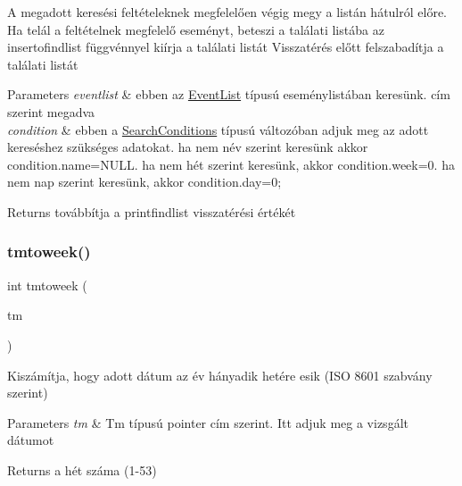 A megadott keresési feltételeknek megfelelően végig megy a listán hátulról előre. Ha telál a feltételnek megfelelő eseményt, beteszi a találati listába az insertofindlist függvénnyel kiírja a találati listát Visszatérés előtt felszabadítja a találati listát 
\begin{DoxyParams}{Parameters}
{\em eventlist} & ebben az \hyperlink{struct_event_list}{Event\+List} típusú eseménylistában keresünk. cím szerint megadva \\
\hline
{\em condition} & ebben a \hyperlink{struct_search_conditions}{Search\+Conditions} típusú változóban adjuk meg az adott kereséshez szükséges adatokat. ha nem név szerint keresünk akkor condition.\+name=N\+U\+LL. ha nem hét szerint keresünk, akkor condition.\+week=0. ha nem nap szerint keresünk, akkor condition.\+day=0; \\
\hline
\end{DoxyParams}
\begin{DoxyReturn}{Returns}
továbbítja a printfindlist visszatérési értékét 
\end{DoxyReturn}
\mbox{\label{group__search_ga4e80bfd47c2fef45e9f6f50632544931}} 
\subsubsection{\texorpdfstring{tmtoweek()}{tmtoweek()}}
{\footnotesize\ttfamily int tmtoweek (\begin{DoxyParamCaption}\item[{\hyperlink{group__list_gaffc453d30a4a6ce81ed778fd04d2d256}{Tm} $\ast$}]{tm }\end{DoxyParamCaption})}

Kiszámítja, hogy adott dátum az év hányadik hetére esik (I\+SO 8601 szabvány szerint) 
\begin{DoxyParams}{Parameters}
{\em tm} & Tm típusú pointer cím szerint. Itt adjuk meg a vizsgált dátumot \\
\hline
\end{DoxyParams}
\begin{DoxyReturn}{Returns}
a hét száma (1-\/53) 
\end{DoxyReturn}
